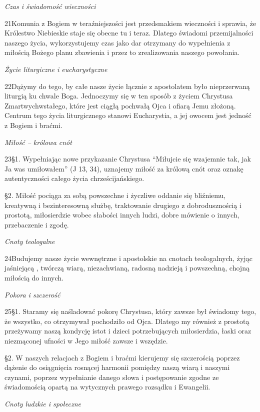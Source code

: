 ﻿\documentclass{book}
\newcommand{\lett}[1]{\lettrine[findent=6pt]{#1}}
\newcommand{\ssec}[1]{\vspace{1em}\textit{#1}\vspace{.5em}\nopagebreak}
\begin{document}
\ssec{Czas i świadomość wieczności}


\lett{21} Komunia z Bogiem w teraźniejszości jest przedsmakiem wieczności i sprawia, że Królestwo Niebieskie staje się obecne tu i teraz. Dlatego  świadomi przemijalności naszego życia, wykorzystujemy czas jako dar otrzymany do wypełnienia z miłością Bożego planu zbawienia i przez to zrealizowania naszego powołania.


\ssec{Życie liturgiczne i eucharystyczne}
 
\lett{22} Dążymy do tego, by całe nasze życie łącznie z apostolatem było nieprzerwaną liturgią ku chwale Boga. Jednoczymy się w ten sposób z życiem Chrystusa Zmartwychwstałego, które jest ciągłą pochwałą Ojca i ofiarą Jemu złożoną. Centrum tego życia liturgicznego stanowi Eucharystia, a jej owocem jest jedność z Bogiem i braćmi.
 
\ssec{Miłość – królowa cnót}
 
\lett{23} \S{}1. Wypełniając nowe przykazanie Chrystusa “Miłujcie się wzajemnie tak, jak Ja was umiłowałem” (J 13, 34), uznajemy miłość za królową cnót oraz oznakę autentyczności całego życia chrześcijańskiego.


\S{}2. Miłość pociąga za sobą powszechne i życzliwe oddanie się bliźniemu, kreatywną i bezinteresowną służbę, traktowanie drugiego z dobrodusznością i prostotą, miłosierdzie wobec słabości innych ludzi, dobre mówienie o innych, przebaczenie i zgodę.
 
\ssec{Cnoty teologalne}


\lett{24} Budujemy nasze życie wewnętrzne i apostolskie na cnotach teologalnych, żyjąc jaśniejącą , twórczą wiarą, niezachwianą, radosną nadzieją i powszechną, chojną miłością do innych. 
 
\ssec{Pokora i szczerość}
 
\lett{25} \S{}1. Staramy się naśladować pokorę Chrystusa, który zawsze był świadomy tego, że wszystko, co otrzymywał pochodziło od Ojca. Dlatego my również z prostotą przeżywamy naszą kondycję istot i dzieci potrzebujących miłosierdzia, łaski oraz niezmąconej ufności w Jego miłość zawsze i wszędzie.


\S{}2. W naszych relacjach z Bogiem i braćmi kierujemy się szczerością poprzez dążenie do osiągnięcia rosnącej harmonii pomiędzy naszą wiarą i naszymi czynami, poprzez wypełnianie danego słowa i postępowanie zgodne ze świadomością opartą na wytycznych prawego rozsądku i Ewangelii.
 
\ssec{Cnoty ludzkie i społeczne}
 
\end{document}
